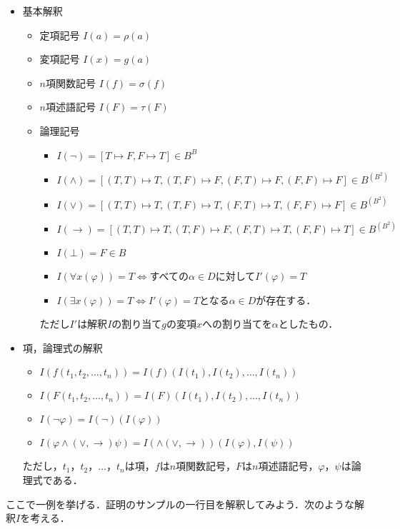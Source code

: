 \documentclass[10pt,b5paper,papersize,dvipdfmx]{jsbook}
\begin{document}
\begin{itemize}
\item 基本解釈
\begin{itemize}
\item 定項記号 $I(a)=\rho(a)$
\item 変項記号 $I(x)=g(a)$
\item $n$項関数記号 $I(f)=\sigma(f)$
\item $n$項述語記号 $I(F)=\tau(F)$
\item 論理記号
\begin{itemize}
\item $I(\lnot)=[T\mapsto F,F\mapsto T]\in B^B$
\item $I(\land)=[(T,T)\mapsto T,(T,F)\mapsto F,(F,T)\mapsto F,(F,F)\mapsto F]\in B^{(B^2)}$
\item $I(\lor)=[(T,T)\mapsto T,(T,F)\mapsto T,(F,T)\mapsto T,(F,F)\mapsto F]\in B^{(B^2)}$
\item $I(\to)=[(T,T)\mapsto T,(T,F)\mapsto F,(F,T)\mapsto T,(F,F)\mapsto T]\in B^{(B^2)}$
\item $I(\bot)=F\in B$
\item $I(\forall x(\varphi))=T\Leftrightarrow$すべての$\alpha \in D$に対して$I'(\varphi)=T$
\item $I(\exists x(\varphi))=T\Leftrightarrow$$I'(\varphi)=T$となる$\alpha \in D$が存在する．
\end{itemize}
ただし$I'$は解釈$I$の割り当て$g$の変項$x$への割り当てを$\alpha$としたもの．
\end{itemize}
\item 項，論理式の解釈
\begin{itemize}
\item $I(f(t_1,t_2,\dots,t_n))=I(f)(I(t_1),I(t_2),\dots,I(t_n))$
\item $I(F(t_1,t_2,\dots,t_n))=I(F)(I(t_1),I(t_2),\dots,I(t_n))$
\item $I(\lnot \varphi)=I(\lnot)(I(\varphi))$
\item $I(\varphi \land(\lor,\to)\psi)=I(\land(\lor,\to))(I(\varphi),I(\psi))$
\end{itemize}
ただし，$t_1$，$t_2$，$\dots$，$t_n$は項，$f$は$n$項関数記号，$F$は$n$項述語記号，$\varphi$，$\psi$は論理式である．
\end{itemize}
ここで一例を挙げる．証明のサンプルの一行目を解釈してみよう．次のような解釈$I$を考える．
\end{document}
